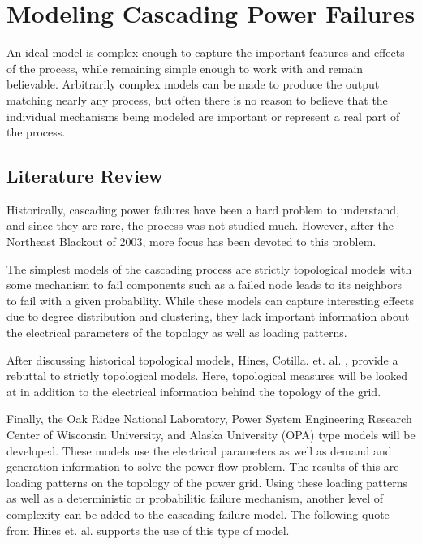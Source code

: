 \newcommand{\mypathmsip}{../thesis/msip}
\newcommand{\mypathmsipdata}{../thesis/msip/data}
\chapter{Modeling Cascading Power Failures}\label{msip-model}
An ideal model is complex enough to capture the important features and effects of the process, while remaining simple enough to work with and remain believable.  Arbitrarily complex models can be made to produce the output matching nearly any process, but often there is no reason to believe that the individual mechanisms being modeled are important or represent a real part of the process.

\section{Literature Review}
Historically, cascading power failures have been a hard problem to understand, and since they are rare, the process was not studied much.  However, after the Northeast Blackout of 2003, more focus has been devoted to this problem.  

The simplest models of the cascading process are strictly topological models with some mechanism to fail components such as a failed node leads to its neighbors to fail with a given probability.  While these models can capture interesting effects due to degree distribution and clustering, they lack important information about the electrical parameters of the topology as well as loading patterns.   

After discussing historical topological models, Hines, Cotilla. et. al. \cite{hines_2010}, \cite{cotilla_2012} provide a rebuttal to strictly topological models.  Here, topological measures will be looked at in addition to the electrical information behind the topology of the grid. 

Finally, the Oak Ridge National Laboratory, Power System Engineering Research Center of Wisconsin University, and Alaska University (OPA) type models will be developed.  These models use the electrical parameters as well as demand and generation information to solve the power flow problem.  The results of this are loading patterns on the topology of the power grid.  Using these loading patterns as well as a deterministic or probabilitic failure mechanism, another level of complexity can be added to the cascading failure model.  The following quote from Hines et. al. \cite{hines_2011} supports the use of this type of model.


